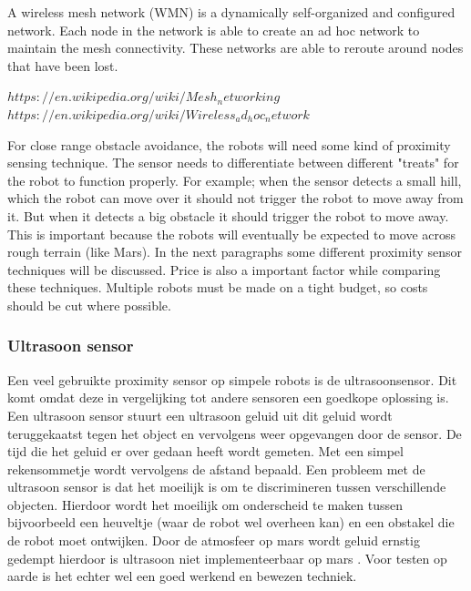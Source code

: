 \documentclass[10pt,a4paper]{article}
\begin{document}
A wireless mesh network (WMN) is a dynamically self-organized and configured network. Each node in the network is able to create an ad hoc network to maintain the mesh connectivity. These networks are able to reroute around nodes that have been lost. 



$https://en.wikipedia.org/wiki/Mesh_networking$
$https://en.wikipedia.org/wiki/Wireless_ad_hoc_network$



For close range obstacle avoidance, the robots will need some kind of proximity sensing technique. The sensor needs to differentiate between different "treats" for the robot to function properly. For example; when the sensor detects a small hill, which the robot can move over it should not trigger the robot to move away from it. But when it detects a big obstacle it should trigger the robot to move away. This is important because the robots will eventually be expected to move across rough terrain (like Mars). In the next paragraphs some different proximity sensor techniques will be discussed. Price is also a important factor while comparing these techniques. Multiple robots must be made on a tight budget, so costs should be cut where possible.\\


\subsubsection{Ultrasoon sensor}
Een veel gebruikte proximity sensor op simpele robots is de ultrasoonsensor. Dit komt omdat deze in vergelijking tot andere sensoren een goedkope oplossing is. Een ultrasoon sensor stuurt een ultrasoon geluid uit dit geluid wordt teruggekaatst tegen het object en vervolgens weer opgevangen door de sensor. De tijd die het geluid er over gedaan heeft wordt gemeten. Met een simpel rekensommetje wordt vervolgens de afstand bepaald. Een probleem met de ultrasoon sensor is dat het moeilijk is om te discrimineren tussen verschillende objecten. Hierdoor wordt het moeilijk om onderscheid te maken tussen bijvoorbeeld een heuveltje (waar de robot wel overheen kan) en een obstakel die de robot moet ontwijken. Door de atmosfeer op mars wordt geluid ernstig gedempt hierdoor is ultrasoon niet implementeerbaar op mars \cite{soundonmars}. Voor testen op aarde is het echter wel een goed werkend en bewezen techniek.
\end{document}
